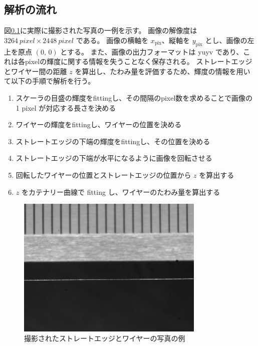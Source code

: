 \documentclass[../../main.tex]{subfiles}
\begin{document}
\subsection{解析の流れ}
図\ref{}に実際に撮影された写真の一例を示す。
画像の解像度は $\SI{3264}{pixel}\times\SI{2448}{pixel}$ である。
画像の横軸を $x_{\mathrm{pix}}$、縦軸を $y_{\mathrm{pix}}$ とし、画像の左上を原点 $(0,\,0)$ とする。
また、画像の出力フォーマットは yuyv であり、これは各pixelの輝度に関する情報を失うことなく保存される。
ストレートエッジとワイヤー間の距離 $z$ を算出し、たわみ量を評価するため、輝度の情報を用いて以下の手順で解析を行う。
\begin{enumerate}
    \item スケーラの目盛の輝度をfittingし、その間隔のpixel数を求めることで画像の 1 pixel が対応する長さを決める
    \item ワイヤーの輝度をfittingし、ワイヤーの位置を決める
    \item ストレートエッジの下端の輝度をfittingし、その位置を決める
    \item ストレートエッジの下端が水平になるように画像を回転させる
    \item 回転したワイヤーの位置とストレートエッジの位置から $z$ を算出する
    \item $z$ をカテナリー曲線で fitting し、ワイヤーのたわみ量を算出する
\end{enumerate}
\begin{figure}
    \centering
    \includegraphics[width=0.8\textwidth]{wiresag/20241217_UHF_3_wire2_x467_gray.png}
    \caption{撮影されたストレートエッジとワイヤーの写真の例}
    \label{fig:wiresag_picture}    
\end{figure}
\end{document}
